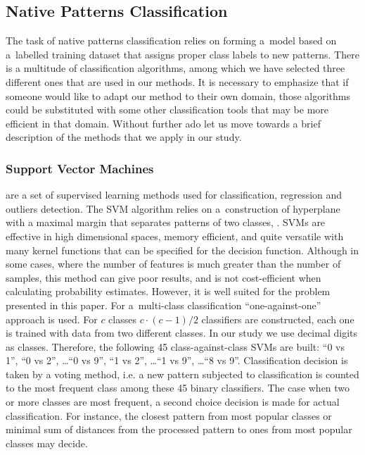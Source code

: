 \documentclass{llncs}
\begin{document}
\vspace{-9pt}
\subsection{Native Patterns Classification}
  \label{sec:Classifiers}
\vspace{-3pt}

The task of native patterns classification relies on forming a~model based on a~labelled training dataset that assigns proper class labels to new patterns. There is a multitude of classification algorithms, among which we have selected three different ones that are used in our methods. It is necessary to emphasize that if someone would like to adapt our method to their own domain, those algorithms could be substituted with some other classification tools that may be more efficient in that domain. Without further ado let us move towards a brief description of the methods that we apply in our study.

\vspace{-9pt}
\subsubsection{Support Vector Machines}

are a set of supervised learning methods used for classification, regression and outliers detection. The SVM algorithm relies on a~construction of hyperplane with a maximal margin that separates patterns of two classes, \cite{CortesVapnik1995}. SVMs are effective in high dimensional spaces, memory efficient, and quite versatile with many kernel functions that can be specified for the decision function. Although in some cases, where the number of features is much greater than the number of samples, this method can give poor results, and is not cost-efficient when calculating probability estimates. However, it is well suited for the problem presented in this paper. For a~multi-class classification ``one-against-one'' approach is used. For $c$ classes $c \cdot (c - 1) / 2$ classifiers are constructed, each one is trained with data from two different classes. In our study we use decimal digits as classes. Therefore, the following 45 class-against-class SVMs are built: ``0 vs 1'', ``0 vs 2'', \dots ``0 vs 9'', ``1 vs 2'', \dots ``1 vs 9'',  \dots ``8 vs 9''. Classification decision is taken by a voting method, i.e. a new pattern subjected to classification is counted to the most frequent class among these 45 binary classifiers. The case when two or more classes are most frequent, a second choice decision is made for actual classification. For instance, the closest pattern from most popular classes or minimal sum of distances from the processed pattern to ones from most popular classes may decide.  
\end{document}
